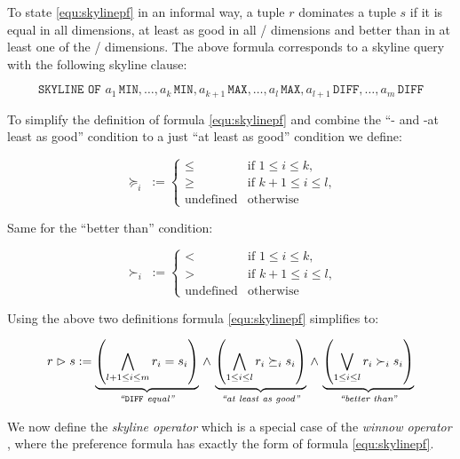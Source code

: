 To state \eqref{equ:skylinepf} in an informal way, a tuple $r$
dominates a tuple $s$ if it is equal in all 
dimensions, at least as good in all /
dimensions and better than in at least one of the
/ dimensions.
%
The above formula corresponds to a skyline query with the following
skyline clause:

\[
\texttt{SKYLINE OF\ } a_1\,\texttt{MIN}, \ldots, a_k\,\texttt{MIN}, a_{k+1}\,\texttt{MAX}, \ldots, a_l\,\texttt{MAX}, a_{l+1}\,\texttt{DIFF}, \ldots, a_m\,\texttt{DIFF}
\]

\bigskip
To simplify the definition of formula \eqref{equ:skylinepf} and
combine the ``- and -at least as good''
condition to a just ``at least as good'' condition we define:

\begin{equation}
\succeq_i\; := 
\begin{cases}
\le & \text{if $1 \le i \le k$,} \\
\ge & \text{if $k+1 \le i \le l$,} \\
\text{undefined} & \text{otherwise}
\end{cases}
\end{equation}

\pagebreak[3]
\noindent
Same for the ``better than'' condition:

\begin{equation}
\succ_i\; := 
\begin{cases}
< & \text{if $1 \le i \le k$,} \\
> & \text{if $k+1 \le i \le l$,} \\
\text{undefined} & \text{otherwise}
\end{cases}
\end{equation}

\noindent
Using the above two definitions formula \eqref{equ:skylinepf}
simplifies to:

\begin{equation}
r \vartriangleright s := 
\underbrace{\left( \bigwedge_{l+1 \le i \le m} r_i = s_i \right)}_{\textit{``\/}\texttt{DIFF}\textit{ equal''}} \,\land\,
\underbrace{\left( \bigwedge_{1 \le i \le l} r_i \succeq_i s_i \right)}_{\textit{``at least as good''}} \,\land\,
\underbrace{\left( \bigvee_{1 \le i \le l} r_i \succ_i s_i \right)}_{\textit{``better than''}}
\end{equation}


We now define the \emph{skyline operator} which is a special
case of the \emph{winnow operator} \citep{Chomicki2003a}, where the
preference formula has exactly the form of formula
\eqref{equ:skylinepf}.

